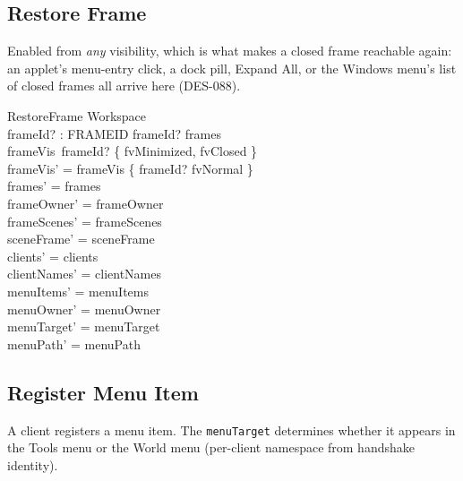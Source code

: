 \documentclass[a4paper,10pt,fleqn]{article}
\begin{document}
\subsection{Restore Frame}

Enabled from \emph{any} visibility, which is what makes a closed frame
reachable again: an applet's menu-entry click, a dock pill, Expand All,
or the Windows menu's list of closed frames all arrive here (DES-088).

\begin{schema}{RestoreFrame}
  \Delta Workspace \\
  frameId? : FRAMEID
  \where
  frameId? \in frames \\
  frameVis~frameId? \in \{ fvMinimized, fvClosed \} \\
  frameVis' = frameVis \oplus \{ frameId? \mapsto fvNormal \} \\
  frames' = frames \\
  frameOwner' = frameOwner \\
  frameScenes' = frameScenes \\
  sceneFrame' = sceneFrame \\
  clients' = clients \\
  clientNames' = clientNames \\
  menuItems' = menuItems \\
  menuOwner' = menuOwner \\
  menuTarget' = menuTarget \\
  menuPath' = menuPath
\end{schema}

\subsection{Register Menu Item}

A client registers a menu item.  The \texttt{menuTarget} determines
whether it appears in the Tools menu or the World menu
(per-client namespace from handshake identity).
\end{document}
